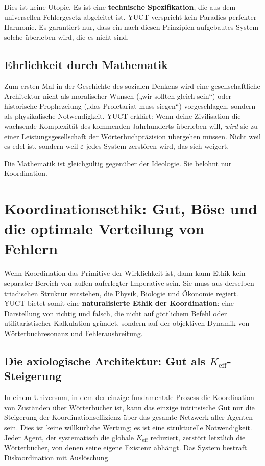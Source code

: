\documentclass[12pt,a4paper]{article}
\begin{document}
Dies ist keine Utopie. Es ist eine \textbf{technische Spezifikation}, die aus dem universellen Fehlergesetz abgeleitet ist. YUCT verspricht kein Paradies perfekter Harmonie. Es garantiert nur, dass ein nach diesen Prinzipien aufgebautes System solche überleben wird, die es nicht sind.

\subsection{Ehrlichkeit durch Mathematik}

Zum ersten Mal in der Geschichte des sozialen Denkens wird eine gesellschaftliche Architektur nicht als moralischer Wunsch („wir sollten gleich sein“) oder historische Prophezeiung („das Proletariat muss siegen“) vorgeschlagen, sondern als physikalische Notwendigkeit. YUCT erklärt: Wenn deine Zivilisation die wachsende Komplexität des kommenden Jahrhunderts überleben will, \emph{wird} sie zu einer Leistungsgesellschaft der Wörterbuchpräzision übergehen müssen. Nicht weil es edel ist, sondern weil \(\varepsilon\) jedes System zerstören wird, das sich weigert.

Die Mathematik ist gleichgültig gegenüber der Ideologie. Sie belohnt nur Koordination.

\section{Koordinationsethik: Gut, Böse und die optimale Verteilung von Fehlern}
\label{sec:coordination-ethics}

Wenn Koordination das Primitive der Wirklichkeit ist, dann kann Ethik kein separater Bereich von außen auferlegter Imperative sein. Sie muss aus derselben triadischen Struktur entstehen, die Physik, Biologie und Ökonomie regiert. YUCT bietet somit eine \textbf{naturalisierte Ethik der Koordination}: eine Darstellung von richtig und falsch, die nicht auf göttlichem Befehl oder utilitaristischer Kalkulation gründet, sondern auf der objektiven Dynamik von Wörterbuchresonanz und Fehlerausbreitung.

\subsection{Die axiologische Architektur: Gut als \(K_{\mathrm{eff}}\)-Steigerung}

In einem Universum, in dem der einzige fundamentale Prozess die Koordination von Zuständen über Wörterbücher ist, kann das einzige intrinsische Gut nur die Steigerung der Koordinationseffizienz über das gesamte Netzwerk aller Agenten sein. Dies ist keine willkürliche Wertung; es ist eine strukturelle Notwendigkeit. Jeder Agent, der systematisch die globale \(K_{\mathrm{eff}}\) reduziert, zerstört letztlich die Wörterbücher, von denen seine eigene Existenz abhängt. Das System bestraft Diskoordination mit Auslöschung.
\end{document}
